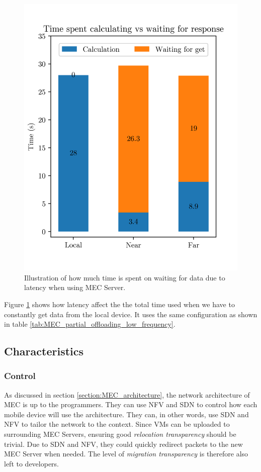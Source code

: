 \begin{figure}[t]
    \centering
    \includegraphics[scale=1]{chapters/6_evaluation/figures/MEC_Partial_bar.png}
    \caption{Illustration of how much time is spent on waiting for data due to latency when using MEC Server.}
    \label{fig:MEC_partial_bar}
\end{figure}

Figure \ref{fig:MEC_partial_bar} shows how latency affect the the total time used when we have to constantly get data from the local device. It uses the same configuration as shown in table \ref{tab:MEC_partial_offloading_low_frequency}.





\subsection{Characteristics}

\subsubsection{Control}
As discussed in section \ref{section:MEC_architecture}, the network architecture of MEC is up to the programmers. They can use NFV and SDN to control how each mobile device will use the architecture. They can, in other words, use SDN and NFV to tailor the network to the context. Since VMs can be uploaded to surrounding MEC Servers, ensuring good \textit{relocation transparency} should be trivial. Due to SDN and NFV, they could quickly redirect packets to the new MEC Server when needed. The level of \textit{migration transparency} is therefore also left to developers.

